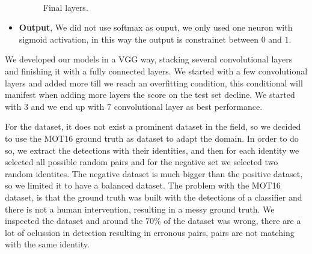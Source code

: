 \documentclass[12pt, a4paper, titlepage,twoside,openright]{article}
\begin{document}
\begin{itemize}
\begin{figure}[H]
\\



\caption{Final layers.}
\label{siameseData2}
\end{figure}


\item \textbf{Output}, We did not use softmax as ouput, we only used one neuron with sigmoid activation, in this way the output is constrainet between $0$ and $1$.



\end{itemize}

  

We developed our models in a VGG way, stacking  several convolutional layers and finishing it with a fully connected layers. We started with a few convolutional layers and added more till we reach an overfitting condition, this conditional will manifest when adding more layers the score on the test set decline. We started with $3$ and we end up with $7$ convolutional layer as best performance.

For the dataset, it does not exist a prominent dataset in the field, so we decided to use the MOT16 ground truth as dataset to adapt the domain. In order to do so, we extract the detections with their identities, and then for each identity we selected all possible random pairs and for the negative set we selected two random identites. The negative dataset is much bigger than the positive dataset, so we limited it to have a balanced dataset. The problem with the MOT16 dataset, is that the ground truth was built with the detections of a classifier and there is not a human intervention, resulting in a messy ground truth. We inspected the dataset and around the $70 \%$ of the dataset was wrong, there are a lot of oclussion in detection resulting in erronous pairs, pairs are not matching with the same identity.
\end{document}
